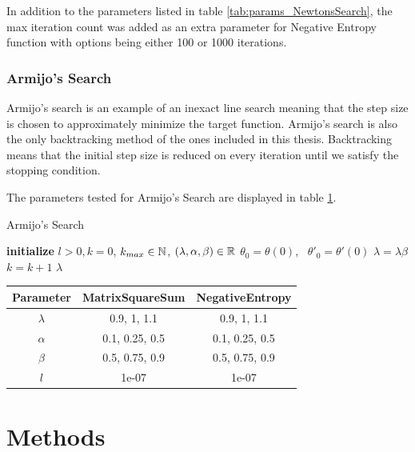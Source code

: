 \documentclass[a4paper,english,titlepage,12pt]{article}
\newcommand{\R}{\ensuremath\mathbb{R}}
\newcommand{\N}{\ensuremath\mathbb{N}}
\begin{document}
In addition to the parameters listed in table \ref{tab:params_NewtonsSearch}, the max iteration count was added as an extra parameter for Negative Entropy function with options being either 100 or 1000 iterations.


\subsubsection{Armijo's Search}

Armijo's search is an example of an inexact line search meaning that the step size is chosen to approximately minimize the target function. Armijo's search is also the only backtracking method of the ones included in this thesis. Backtracking means that the initial step size is reduced on every iteration until we satisfy the stopping condition. \cite{book:convex_optimization}

The parameters tested for Armijo's Search are displayed in table \ref{tab:params_ArmijoSearch}.

\begin{algorithm}[H]
\caption{Armijo's Search}
\label{alg_armijo}
\begin{algorithmic}[1]
\STATE \textbf{initialize} $l > 0, k = 0$, $k_{max} \in \N$, $(\lambda, \alpha, \beta) \in \R$
\STATE $\theta_0 = \theta(0)$, \ $\theta'_0 = \theta'(0)$
    \STATE $\lambda = \lambda \beta$
    \STATE $k = k + 1$
\ENDWHILE
\RETURN $\lambda$
\end{algorithmic}
\end{algorithm}

\begin{table}[H]
\label{tab:params_ArmijoSearch}
\centering
{}
\begin{tabular}{|c|c|c|}
\hline
\rowcolor{gray!25}
Parameter & MatrixSquareSum & NegativeEntropy \\
\hline
$\lambda$ & 0.9, 1, 1.1 & 0.9, 1, 1.1 \\
$\alpha$ & 0.1, 0.25, 0.5 & 0.1, 0.25, 0.5 \\
$\beta$ & 0.5, 0.75, 0.9 & 0.5, 0.75, 0.9 \\
$l$ & 1e-07 & 1e-07 \\
\hline
\end{tabular}
\end{table}


\section{Methods}
\end{document}
